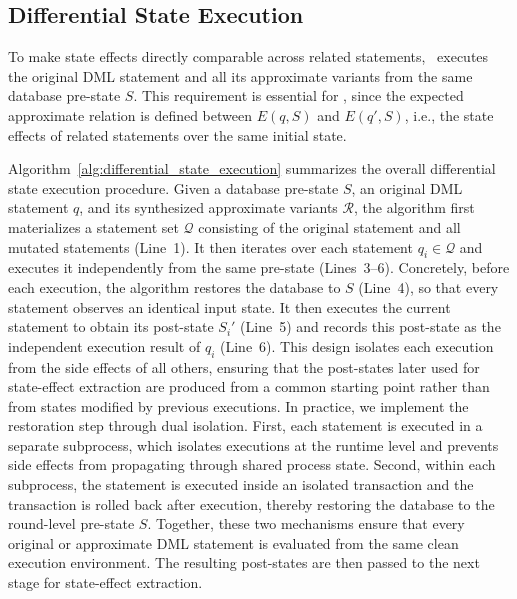 \subsection{Differential State Execution}
\label{subsec:Differential State Execution}

To make state effects directly comparable across related statements, \toolname\ executes the original DML statement and all its approximate variants from the same database pre-state \(S\). 
This requirement is essential for \model, since the expected approximate relation is defined between \(E(q,S)\) and \(E(q',S)\), i.e., the state effects of related statements over the same initial state. 

Algorithm~\ref{alg:differential_state_execution} summarizes the overall differential state execution procedure.
Given a database pre-state \(S\), an original DML statement \(q\), and its synthesized approximate variants \(\mathcal{R}\), the algorithm first materializes a statement set \(\mathcal{Q}\) consisting of the original statement and all mutated statements (Line~1).
It then iterates over each statement \(q_i \in \mathcal{Q}\) and executes it independently from the same pre-state (Lines~3--6).
Concretely, before each execution, the algorithm restores the database to \(S\) (Line~4), so that every statement observes an identical input state.
It then executes the current statement to obtain its post-state \(S_i'\) (Line~5) and records this post-state as the independent execution result of \(q_i\) (Line~6).
This design isolates each execution from the side effects of all others, ensuring that the post-states later used for state-effect extraction are produced from a common starting point rather than from states modified by previous executions.
In practice, we implement the restoration step through dual isolation. 
First, each statement is executed in a separate subprocess, which isolates executions at the runtime level and prevents side effects from propagating through shared process state. 
Second, within each subprocess, the statement is executed inside an isolated transaction and the transaction is rolled back after execution, thereby restoring the database to the round-level pre-state \(S\). 
Together, these two mechanisms ensure that every original or approximate DML statement is evaluated from the same clean execution environment.
The resulting post-states are then passed to the next stage for state-effect extraction.

